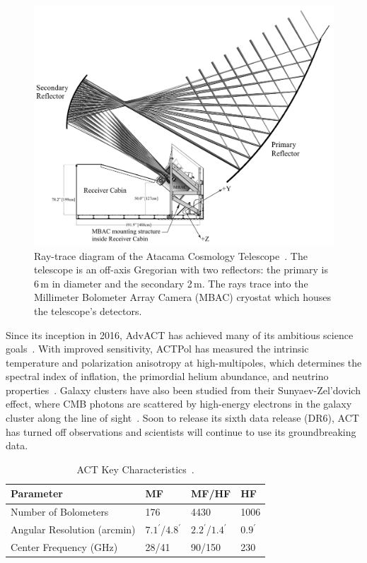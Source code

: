 \begin{figure}[t]
    \centering
    \includegraphics[width = \textwidth]{Figures/act_inst.pdf}
    \caption{Ray-trace diagram of the Atacama Cosmology Telescope~\cite{act_inst}.  The telescope is an off-axis Gregorian with two reflectors: the primary is 6\,m in diameter and the secondary 2\,m.  The rays trace into the Millimeter Bolometer Array Camera (MBAC) cryostat which houses the telescope's detectors.}
    \label{fig:act_inst}
\end{figure}

Since its inception in 2016, AdvACT has achieved many of its ambitious science goals~\cite{2016JLTP184772H}.  With improved sensitivity, ACTPol has measured the intrinsic temperature and polarization anisotropy at high-multipoles, which determines the spectral index of inflation, the primordial helium abundance, and neutrino properties~\cite{10.1117/12.857464}.  Galaxy clusters have also been studied from their Sunyaev-Zel’dovich effect, where CMB photons are scattered by high-energy electrons in the galaxy cluster along the line of sight~\cite{weinberg_cosmo}.  Soon to release its sixth data release (DR6), ACT has turned off observations and scientists will continue to use its groundbreaking data.

\begin{table}[b]
    \centering
    \begin{tabular}{|l|l|l|l|} \hline
        \textbf{ Parameter} & \textbf{MF}   &  \textbf{MF/HF}  & \textbf{HF}  \\ \hline \hline
        Number of Bolometers & 176 & 4430 &1006 \\\hline
        Angular Resolution (arcmin) & $7.1^{\prime}$/$4.8^{\prime}$ & $2.2^{\prime}$/$1.4^{\prime}$ & $0.9^{\prime}$ \\\hline
        Center Frequency (GHz) & 28/41 & 90/150 & 230\\\hline
    \end{tabular} \caption{ACT Key Characteristics~\cite{2016JLTP184772H}.}
    \label{tab:act}
\end{table}
